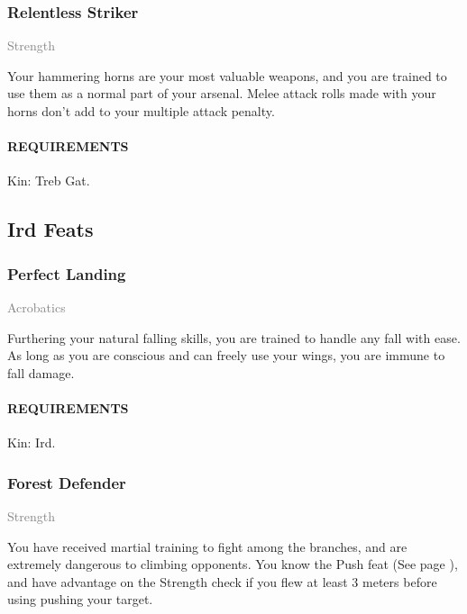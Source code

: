         \subsubsection{Relentless Striker} \label{feat::relentlessstriker}
        \small{\textcolor{gray}{Strength}}

        \normalsize
        Your hammering horns are your most valuable weapons, and you are trained to use them as a normal    part of your arsenal.
        Melee attack rolls made with your horns don't add to your multiple attack penalty.
        \paragraph{REQUIREMENTS} Kin: Treb Gat.

\subsection*{Ird Feats}
    \subsubsection{Perfect Landing} \label{feat::perfectlanding}
    \small{\textcolor{gray}{Acrobatics}}

    \normalsize
    Furthering your natural falling skills, you are trained to handle any fall with ease.
    As long as you are conscious and can freely use your wings, you are immune to fall damage.
    \paragraph{REQUIREMENTS} Kin: Ird.

    \subsubsection{Forest Defender} \label{feat::forestdefender}
    \small{\textcolor{gray}{Strength}}

    \normalsize
    You have received martial training to fight among the branches, and are extremely dangerous to climbing opponents.
    You know the Push feat (See page \pageref{feat::push}), and have advantage on the Strength check if you flew at least 3 meters before using pushing your target.
